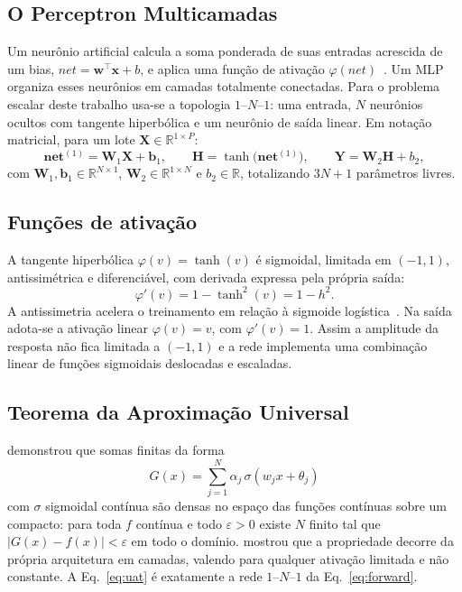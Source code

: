 \documentclass[12pt,oneside,a4paper,english,brazil]{abntex2}
\begin{document}
\subsection{O Perceptron Multicamadas}
Um neurônio artificial calcula a soma ponderada de suas entradas acrescida de
um bias, $\mathit{net}=\mathbf{w}^{\top}\mathbf{x}+b$, e aplica uma função de
ativação $\varphi(\mathit{net})$~\cite{haykin2009}. Um MLP organiza esses
neurônios em camadas totalmente conectadas. Para o problema escalar deste
trabalho usa-se a topologia $1$--$N$--$1$: uma entrada, $N$ neurônios ocultos
com tangente hiperbólica e um neurônio de saída linear. Em notação matricial,
para um lote $\mathbf{X}\in\mathbb{R}^{1\times P}$:
\begin{equation}
\mathbf{net}^{(1)}=\mathbf{W}_1\mathbf{X}+\mathbf{b}_1,\qquad
\mathbf{H}=\tanh\!\big(\mathbf{net}^{(1)}\big),\qquad
\mathbf{Y}=\mathbf{W}_2\mathbf{H}+b_2,
\label{eq:forward}
\end{equation}
com $\mathbf{W}_1,\mathbf{b}_1\in\mathbb{R}^{N\times1}$,
$\mathbf{W}_2\in\mathbb{R}^{1\times N}$ e $b_2\in\mathbb{R}$, totalizando
$3N+1$ parâmetros livres.

\subsection{Funções de ativação}
A tangente hiperbólica $\varphi(v)=\tanh(v)$ é sigmoidal, limitada em
$(-1,1)$, antissimétrica e diferenciável, com derivada expressa pela própria
saída:
\begin{equation}
\varphi'(v)=1-\tanh^2(v)=1-h^2.
\end{equation}
A antissimetria acelera o treinamento em relação à sigmoide
logística~\cite{haykin2009}. Na saída adota-se a ativação linear
$\varphi(v)=v$, com $\varphi'(v)=1$. Assim a amplitude da resposta não fica
limitada a $(-1,1)$ e a rede implementa uma combinação linear de funções
sigmoidais deslocadas e escaladas.

\subsection{Teorema da Aproximação Universal}
 demonstrou que somas finitas da forma
\begin{equation}
G(x)=\sum_{j=1}^{N}\alpha_j\,\sigma\!\left(w_j x+\theta_j\right)
\label{eq:uat}
\end{equation}
com $\sigma$ sigmoidal contínua são densas no espaço das funções contínuas
sobre um compacto: para toda $f$ contínua e todo $\varepsilon>0$ existe $N$
finito tal que $|G(x)-f(x)|<\varepsilon$ em todo o domínio.
 mostrou que a propriedade decorre da própria
arquitetura em camadas, valendo para qualquer ativação limitada e não
constante. A Eq.~\eqref{eq:uat} é exatamente a rede $1$--$N$--$1$ da
Eq.~\eqref{eq:forward}.
\end{document}
